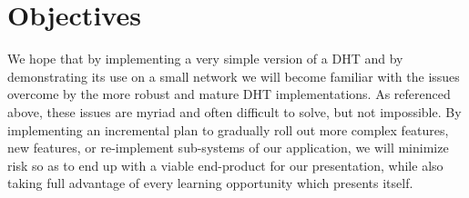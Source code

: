 \documentclass[12pt]{report}
\begin{document}
    \section{Objectives}
    We hope that by implementing a very simple version of a DHT and by demonstrating
    its use on a small network we will become familiar with the issues
    overcome by the more robust and mature DHT implementations.  As referenced above,
    these issues are myriad and often difficult to solve, but not impossible.
    By implementing an incremental plan to gradually roll out more complex features, new
    features, or re-implement sub-systems of our application, we will minimize
    risk so as to end up with a viable end-product for our presentation, while
    also taking full advantage of every learning opportunity which presents
    itself.
\end{document}
